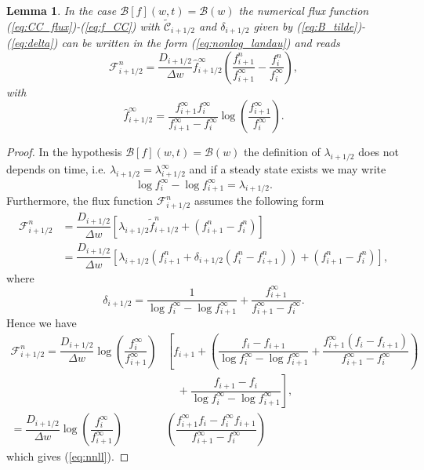 \documentclass[a4paper]{article}
\newtheorem{lemma}{Lemma}
\theoremstyle{remark}\newtheorem{remark}{Remark}
\newcommand{\F}{\mathcal{F}}
\newcommand{\B}{\mathcal{B}}
\newcommand{\C}{\mathcal{C}}
\newcommand{\be}{\begin{equation}}
\newcommand{\ee}{\end{equation}}
\begin{document}
\begin{lemma}\label{lem:flux_CCE}
 In the case $\B[f](w,t)=\B(w)$ the numerical flux function (\ref{eq:CC_flux})-(\ref{eq:f_CC}) with $\tilde{\C}_{i+1/2}$ and $\delta_{i+1/2}$ given by (\ref{eq:B_tilde})-(\ref{eq:delta}) can be written in the form (\ref{eq:nonlog_landau}) and reads
 \be
 \F_{i+1/2}^n = \dfrac{D_{i+1/2}}{\Delta w} \hat f_{i+1/2}^{\infty} \left( \dfrac{f^n_{i+1}}{f^{\infty}_{i+1}}-\dfrac{f^n_i}{f^{\infty}_i} \right),
 \label{eq:nnll}
 \ee
 with 
 \[
 \hat{f}^{\infty}_{i+1/2} = \dfrac{f_{i+1}^{\infty}f_i^{\infty}}{f_{i+1}^{\infty}-f_i^{\infty}}\log \left(\dfrac{f_{i+1}^{\infty}}{f_i^{\infty}}\right).
 \]
 \end{lemma}
 \begin{proof}
 In the hypothesis $\B[f](w,t)=\mathcal  B(w)$ the definition of $\lambda_{i+1/2}$ does not depends on time, i.e. $\lambda_{i+1/2}=\lambda_{i+1/2}^{\infty}$ and if a steady state exists we may write
 \[
 \log f_{i}^{\infty}-\log f_{i+1}^{\infty} = \lambda_{i+1/2}.
 \]
Furthermore, the flux function $\F^n_{i+1/2}$ assumes the following form
 \be\begin{split}
 \F^n_{i+1/2} &= \dfrac{D_{i+1/2}}{\Delta w}\left[ \lambda_{i+1/2}\tilde{f}^{n}_{i+1/2} +(f_{i+1}^n-f_i^n)\right]\\
 &=  \dfrac{D_{i+1/2}}{\Delta w}\left[ \lambda_{i+1/2} (f_{i+1}^n+\delta_{i+1/2}(f_i^n-f_{i+1}^n)) +(f_{i+1}^n-f_i^n)\right],
 \end{split}\ee
 where 
 \be
 \delta_{i+1/2} = \dfrac{1}{\log f_{i}^{\infty}-\log f_{i+1}^{\infty}}+\dfrac{f_{i+1}^{\infty}}{f_{i+1}^{\infty}-f_i^{\infty}}.
 \ee
 Hence we have
   \be\begin{split}
 \mathcal F_{i+1/2}^n = \dfrac{D_{i+1/2}}{\Delta w} \log \left( \dfrac{f^{\infty}_i}{f_{i+1}^{\infty}}\right)  &\left[f_{i+1}+ \left(\dfrac{f_i-f_{i+1}}{\log f_{i}^{\infty}-\log f_{i+1}^{\infty}}+\dfrac{f_{i+1}^{\infty}(f_i-f_{i+1})}{f_{i+1}^{\infty}-f_i^{\infty}}\right)\right.\\
 &\left.\quad+\dfrac{f_{i+1}-f_{i}}{\log f_i^{\infty}-\log f_{i+1}^{\infty}}  \right], \\
 = \dfrac{D_{i+1/2}}{\Delta w} \log\left( \dfrac{f^{\infty}_i}{f_{i+1}^{\infty}}\right)& \left( \dfrac{f_{i+1}^{\infty}f_i-f_{i}^{\infty}f_{i+1}}{f_{i+1}^{\infty}-f_i^{\infty}} \right)
 \end{split}\ee
  which gives (\ref{eq:nnll}).
 \end{proof}
\end{document}
